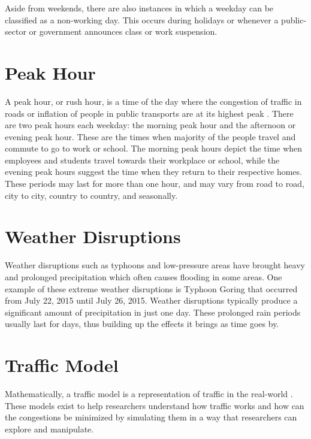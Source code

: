 Aside from weekends, there are also instances in which a weekday can be classified as a non-working day. This occurs during holidays or whenever a public-sector or government announces class or work suspension.



\section{Peak Hour}
A peak hour, or rush hour, is a time of the day where the congestion of traffic in roads or inflation of people in public transports are at its highest peak . There are two peak hours each weekday: the morning peak hour and the afternoon or evening peak hour. These are the times when majority of the people travel and commute to go to work or school. The morning peak hours depict the time when employees and students travel towards their workplace or school, while the evening peak hours suggest the time when they return to their respective homes. These periods may last for more than one hour, and may vary from road to road, city to city, country to country, and seasonally. 


\section{Weather Disruptions}
Weather disruptions such as typhoons and low-pressure areas have brought heavy and prolonged precipitation which often causes flooding in some areas. One example of these extreme weather disruptions is Typhoon Goring that occurred from July 22, 2015 until July 26, 2015. Weather disruptions typically produce a significant amount of precipitation in just one day. These prolonged rain periods usually last for days, thus building up the effects it brings as time goes by.





\section{Traffic Model}
Mathematically, a traffic model is a representation of traffic in the real-world . These models exist to help researchers understand how traffic works and how can the congestions be minimized by simulating them in a way that researchers can explore and manipulate. 

